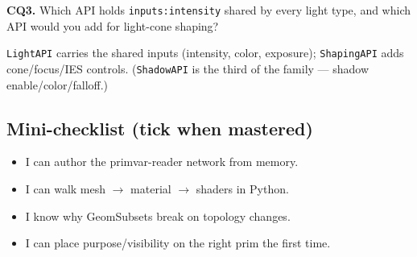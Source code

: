 \noindent\textbf{CQ3.} Which API holds \texttt{inputs:intensity} shared by
every light type, and which API would you add for light-cone shaping?
\begin{DrillSolution}
\texttt{LightAPI} carries the shared inputs (intensity, color, exposure);
\texttt{ShapingAPI} adds cone/focus/IES controls. (\texttt{ShadowAPI} is the
third of the family --- shadow enable/color/falloff.)
\end{DrillSolution}

\subsection*{Mini-checklist (tick when mastered)}
\begin{itemize}[leftmargin=*]
  \item[$\square$] I can author the primvar-reader network from memory.
  \item[$\square$] I can walk mesh $\to$ material $\to$ shaders in Python.
  \item[$\square$] I know why GeomSubsets break on topology changes.
  \item[$\square$] I can place purpose/visibility on the right prim the first time.
\end{itemize}

